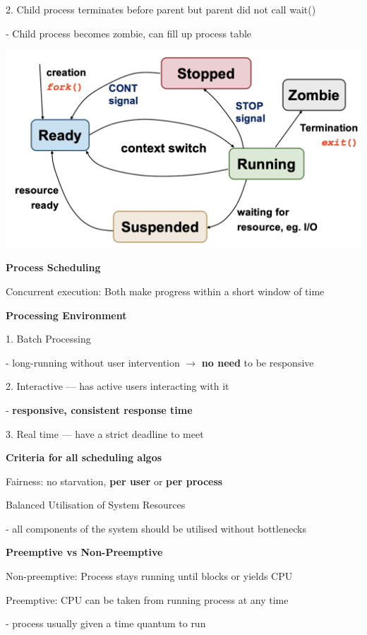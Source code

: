 \documentclass[10pt, a4paper]{article}
\newcommand{\highlight}[1]{{\color{red}\textbf{#1}}}
\newcommand{\blue}[1]{{\color{MidnightBlue}#1}}
\newcommand{\red}[1]{{\color{red}#1}}
\newcommand{\green}[1]{{\color{ForestGreen}#1}}
\newcommand{\header}[1]{{\normalsize\textbf{#1}}}
\newcommand{\tab}[0]{\hspace*{2mm}}
\begin{document}
\begin{multicols*}{3}
		2. Child process terminates before parent but parent did not call wait()

		\tab{} - Child process becomes zombie, can fill up process table

		\includegraphics[scale=.3]{./assets/processStateUnix.png}

		\header{Process Scheduling}

		Concurrent execution: Both make progress within a short window of time
		
		\textbf{Processing Environment}

		1. Batch Processing

		\tab{} - long-running without user intervention $\rightarrow$ \highlight{no need} to be \blue{responsive}

		2. Interactive --- has active users interacting with it

		\tab{} - \highlight{responsive, consistent response time}
		
		3. Real time --- have a strict deadline to meet
		
		\textbf{Criteria for all scheduling algos}

		Fairness: no starvation, \textbf{per user} or \textbf{per process}

		Balanced Utilisation of System Resources

		- all components of the system should be utilised without bottlenecks

		\textbf{Preemptive vs Non-Preemptive}

		Non-preemptive: Process stays running until \blue{blocks} or \blue{yields CPU}

		Preemptive: CPU can be taken from running process at \green{any} time

		- process usually given a \red{time quantum} to run


\end{multicols*}
\end{document}
